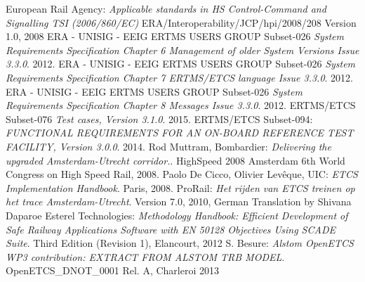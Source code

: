 \documentclass{template/openetcs_article}
\begin{document}
\begin{thebibliography}{9}

  European Rail Agency:
  \emph{Applicable standards in HS Control-Command and Signalling TSI (2006/860/EC)}
  ERA/Interoperability/JCP/hpi/2008/208 Version 1.0, 2008
  ERA - UNISIG - EEIG ERTMS USERS GROUP Subset-026 
  \emph{System Requirements Specification Chapter 6 Management of older System Versions Issue 3.3.0}.
 2012.
  ERA - UNISIG - EEIG ERTMS USERS GROUP Subset-026
  \emph{System Requirements Specification Chapter 7 ERTMS/ETCS language Issue 3.3.0}.
 2012.
  ERA - UNISIG - EEIG ERTMS USERS GROUP Subset-026
  \emph{System Requirements Specification Chapter 8 Messages Issue 3.3.0}.
 2012.
  ERTMS/ETCS Subset-076
  \emph{Test cases, Version 3.1.0}.
 2015.
  ERTMS/ETCS Subset-094:
  \emph{FUNCTIONAL REQUIREMENTS FOR AN ON-BOARD REFERENCE TEST FACILITY, Version 3.0.0}.
 2014.
  Rod Muttram, Bombardier:
  \emph{Delivering the upgraded Amsterdam-Utrecht corridor.}.
  HighSpeed 2008 Amsterdam 6th World Congress on High Speed Rail,
  2008.
  Paolo De Cicco, Olivier Lev\^eque, UIC:
  \emph{ETCS Implementation Handbook}.
  Paris, 2008.
  ProRail:
  \emph{Het rijden van ETCS treinen op het trace Amsterdam-Utrecht}.
  Version 7.0, 2010, German Translation by Shivana Daparoe
  Esterel Technologies:
  \emph{Methodology Handbook: 
Efficient Development of Safe Railway Applications Software with EN 50128 Objectives Using SCADE Suite\textregistered}.
  Third Edition (Revision 1), Elancourt, 2012
  S. Besure:
  \emph{Alstom OpenETCS WP3 contribution:
EXTRACT FROM ALSTOM TRB MODEL}.
  OpenETCS\_DNOT\_0001 Rel. A, Charleroi 2013
\end{thebibliography}

\end{document}
